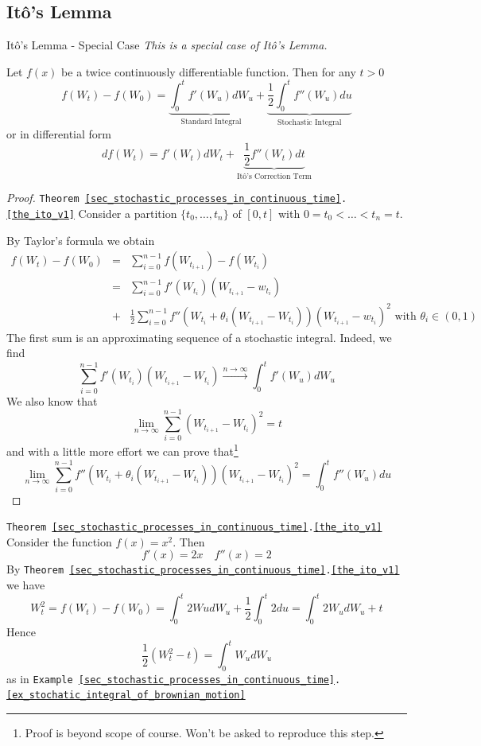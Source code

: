 \documentclass[11pt,a4paper]{article}
\begin{document}
\subsection{It\^o's Lemma}

  \begin{theorem}{It\^o's Lemma - Special Case}\label{the_ito_v1}
    \textit{This is a special case of It\^o's Lemma.}
    \par Let $f(x)$ be a twice continuously differentiable function. Then for any $t>0$
    \[ f(W_t)-f(W_0)=\underbrace{\int_0^tf'(W_u)dW_u}_\text{Standard Integral}+\underbrace{\frac12\int_0^tf''(W_u)du}_\text{Stochastic Integral} \]
    or in differential form
    \[ df(W_t)=f'(W_t)dW_t+\underbrace{\frac12f''(W_t)dt}_\text{It\^o's Correction Term} \]
  \end{theorem}

  \begin{proof}{\texttt{Theorem \ref{sec_stochastic_processes_in_continuous_time}.\ref{the_ito_v1}}}
    Consider a partition $\{t_0,\dots,t_n\}$ of $[0,t]$ with $0=t_0<\dots<t_n=t$.
    \par By Taylor's formula we obtain
    \[\begin{array}{rcl}
      f(W_t)-f(W_0)&=&\sum_{i=0}^{n-1}f(W_{t_{i+1}})-f(W_{t_i})\\
      &=&\sum_{i=0}^{n-1}f'(W_{t_i})(W_{t_{i+1}}-w_{t_i})\\
      &+&\frac12\sum_{i=0}^{n-1}f''(W_{t_i}+\theta_i(W_{t_{i+1}}-W_{t_i}))(W_{t_{i+1}}-w_{t_i})^2\text{ with }\theta_i\in(0,1)
    \end{array}\]
    The first sum is an approximating sequence of a stochastic integral. Indeed, we find
    \[ \sum_{i=0}^{n-1}f'(W_{t_i})(W_{t_{i+1}}-W_{t_i})\overset{n\to\infty}\longrightarrow\int_0^tf'(W_u)dW_u \]
    We also know that
    \[ \lim_{n\to\infty}\sum_{i=0}^{n-1}(W_{t_{i+1}}-W_{t_i})^2=t \]
    and with a little more effort we can prove that\footnote{Proof is beyond scope of course. Won't be asked to reproduce this step.}
    \[ \lim_{n\to\infty}\sum_{i=0}^{n-1}f''(W_{t_i}+\theta_i(W_{t_{i+1}}-W_{t_i}))(W_{t_{i+1}}-W_{t_i})^2=\int_0^tf''(W_u)du \]
  \end{proof}

  \begin{example}{\texttt{Theorem \ref{sec_stochastic_processes_in_continuous_time}.\ref{the_ito_v1}}}
    Consider the function $f(x)=x^2$. Then
    \[ f'(x)=2x\quad f''(x)=2 \]
    By \texttt{Theorem \ref{sec_stochastic_processes_in_continuous_time}.\ref{the_ito_v1}} we have
    \[ W_t^2=f(W_t)-f(W_0)=\int_0^t2WudW_u+\frac12\int_0^t 2du=\int_0^t2W_udW_u+t \]
    Hence
    \[ \frac12(W_t^2-t)=\int_0^tW_udW_u \]
    as in \texttt{Example \ref{sec_stochastic_processes_in_continuous_time}.\ref{ex_stochatic_integral_of_brownian_motion}}
  \end{example}
\end{document}
